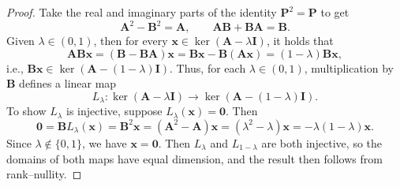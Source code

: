 \documentclass[10pt,a4paper]{amsart}
\begin{document}
\begin{proof}
Take the real and imaginary parts of the identity $\boldsymbol{P}^2=\boldsymbol{P}$ to get
\[
\boldsymbol{A}^2-\boldsymbol{B}^2
=\boldsymbol{A},
\qquad
\boldsymbol{A}\boldsymbol{B}+\boldsymbol{B}\boldsymbol{A}
=\boldsymbol{B}.
\]
Given $\lambda\in(0,1)$, then for every $\boldsymbol{x}\in\operatorname{ker}(\boldsymbol{A}-\lambda\boldsymbol{I})$, it holds that
\[
\boldsymbol{A}\boldsymbol{B}\boldsymbol{x}
=(\boldsymbol{B}-\boldsymbol{B}\boldsymbol{A})\boldsymbol{x}
=\boldsymbol{B}\boldsymbol{x}-\boldsymbol{B}(\boldsymbol{A}\boldsymbol{x})
=(1-\lambda)\boldsymbol{B}\boldsymbol{x},
\]
i.e., $\boldsymbol{B}\boldsymbol{x}\in\operatorname{ker}(\boldsymbol{A}-(1-\lambda)\boldsymbol{I})$.
Thus, for each $\lambda\in(0,1)$, multiplication by $\boldsymbol{B}$ defines a linear map
\[
L_\lambda\colon \operatorname{ker}(\boldsymbol{A}-\lambda\boldsymbol{I})\to\operatorname{ker}(\boldsymbol{A}-(1-\lambda)\boldsymbol{I}).
\]
To show $L_\lambda$ is injective, suppose $L_\lambda(\boldsymbol{x})=\boldsymbol{0}$.
Then
\[
\boldsymbol{0}
=\boldsymbol{B}L_\lambda(\boldsymbol{x})
=\boldsymbol{B}^2\boldsymbol{x}
=(\boldsymbol{A}^2-\boldsymbol{A})\boldsymbol{x}
=(\lambda^2-\lambda)\boldsymbol{x}
=-\lambda(1-\lambda)\boldsymbol{x}.
\]
Since $\lambda\notin\{0,1\}$, we have $\boldsymbol{x}=\boldsymbol{0}$.
Then $L_\lambda$ and $L_{1-\lambda}$ are both injective, so the domains of both maps have equal dimension, and the result then follows from rank--nullity.
\end{proof}
\end{document}
